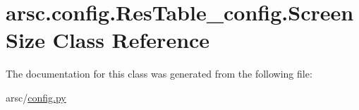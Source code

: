\hypertarget{classarsc_1_1config_1_1ResTable__config_1_1ScreenSize}{}\section{arsc.\+config.\+Res\+Table\+\_\+config.\+Screen\+Size Class Reference}
\label{classarsc_1_1config_1_1ResTable__config_1_1ScreenSize}


The documentation for this class was generated from the following file\+:\begin{DoxyCompactItemize}
\item 
arsc/\mbox{\hyperlink{config_8py}{config.\+py}}\end{DoxyCompactItemize}
